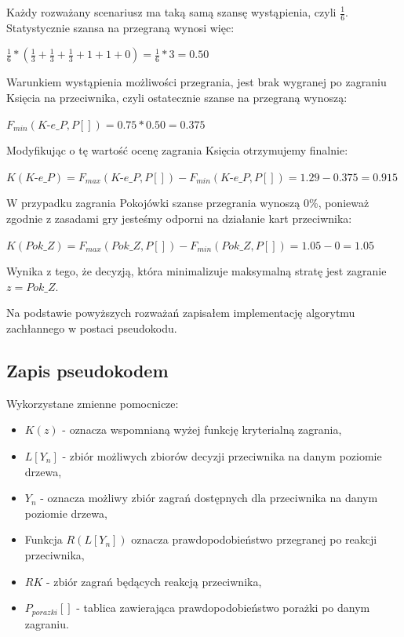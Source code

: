 Każdy rozważany scenariusz ma taką samą szansę wystąpienia, czyli $\frac{1}{6}$. Statystycznie szansa na przegraną wynosi więc:
\begin{center}
 $\frac{1}{6} * (\frac{1}{3} + \frac{1}{3} + \frac{1}{3} + 1 + 1 + 0) = \frac{1}{6} * 3 = 0.50 $
\end{center}
Warunkiem wystąpienia możliwości przegrania, jest brak wygranej po zagraniu Księcia na przeciwnika, czyli ostatecznie szanse na przegraną wynoszą:
\begin{center}
	$F_{min}(\textit{K-e\_P}, P[]) = 0.75 * 0.50 = 0.375$
\end{center}
Modyfikując o tę wartość ocenę zagrania Księcia otrzymujemy finalnie:
\begin{center}
	$K(\textit{K-e\_P}) =  F_{max}(\textit{K-e\_P}, P[]) - F_{min}(\textit{K-e\_P}, P[]) = 1.29 - 0.375 = 0.915$
\end{center} 
W przypadku zagrania Pokojówki szanse przegrania wynoszą 0\%, ponieważ zgodnie z zasadami gry jesteśmy odporni na działanie kart przeciwnika:
\begin{center}
	$K(Pok\_Z) =  F_{max}(Pok\_Z, P[]) - F_{min}(Pok\_Z, P[]) = 1.05 - 0 = 1.05$
\end{center} 
Wynika z tego, że decyzją, która minimalizuje maksymalną stratę jest zagranie $z = Pok\_Z$.

Na podstawie powyższych rozważań zapisałem implementację algorytmu zachłannego w postaci pseudokodu.
\subsection{Zapis pseudokodem}
Wykorzystane zmienne pomocnicze:
\begin{itemize}
	\item $K(z)$ - oznacza wspomnianą wyżej funkcję kryterialną zagrania, 
	\item $L[Y_n]$ - zbiór możliwych zbiorów decyzji przeciwnika na danym poziomie drzewa,
	\item $Y_n$ - oznacza możliwy zbiór zagrań dostępnych dla przeciwnika na danym poziomie drzewa,
	\item Funkcja $R(L[Y_n])$ oznacza prawdopodobieństwo przegranej po reakcji przeciwnika,
	\item $RK$ - zbiór zagrań będących reakcją przeciwnika,
	\item $P_{porazki}[]$ - tablica zawierająca prawdopodobieństwo porażki po danym zagraniu.
\end{itemize}


